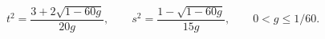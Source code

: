 \begin{equation}
    t^2=\frac{3+2\sqrt{1-60g}}{20g},\qquad
    s^2=\frac{1-\sqrt{1-60g}}{15g},\qquad 0<g\leq1/60.
\end{equation}

